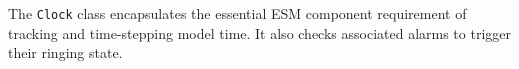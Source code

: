 
The {\tt Clock} class encapsulates the essential ESM component requirement
of tracking and time-stepping model time.  It also checks associated alarms
to trigger their ringing state.
